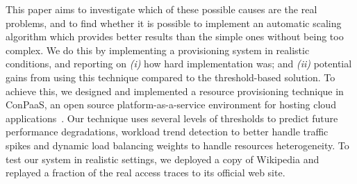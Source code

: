 This paper aims to investigate which of these possible causes 
are the real problems, and to find whether it is possible to
implement an automatic scaling algorithm which provides better 
results than the simple ones without being too complex.
We do this by implementing a provisioning system in realistic 
conditions, and reporting on \emph{(i)} how hard implementation 
was; and \emph{(ii)} potential gains from using this  technique 
compared to the threshold-based solution. To achieve this, we designed 
and implemented a resource provisioning technique in ConPaaS, 
an open source platform-as-a-service environment for hosting 
cloud applications~\cite{conpaasIC}. Our technique uses several
levels of thresholds to predict future performance degradations, 
workload trend detection to better handle traffic spikes
and dynamic load balancing weights to handle resources heterogeneity. 
To test our system in realistic settings, we deployed a copy of 
Wikipedia and replayed a fraction of the real access traces to
its official web site.



